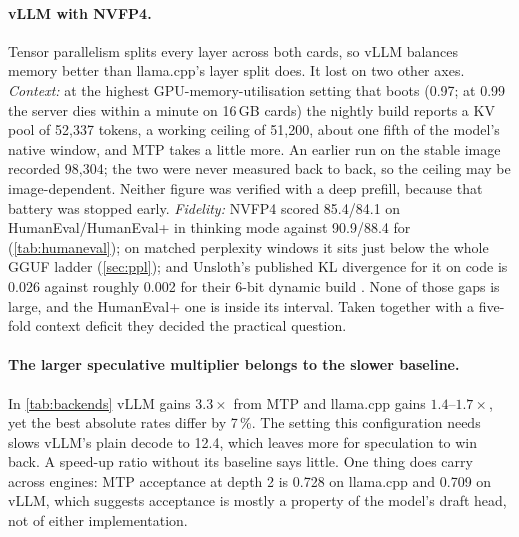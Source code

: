 \paragraph{vLLM with NVFP4.} Tensor parallelism splits every layer across both cards, so vLLM balances
memory better than llama.cpp's layer split does. It lost on two other axes. \emph{Context:} at the
highest GPU-memory-utilisation setting that boots (0.97; at 0.99 the server dies within a minute on
16\,GB cards) the nightly build reports a KV pool of 52{,}337 tokens, a working ceiling of 51{,}200,
about one fifth of the model's native window, and MTP takes a little more. An earlier run on the
stable image recorded 98{,}304; the two were never measured back to back, so the ceiling may be
image-dependent. Neither figure was verified with a deep prefill, because that battery was stopped
early. \emph{Fidelity:} NVFP4 scored 85.4/84.1 on HumanEval/HumanEval+ in thinking mode against
90.9/88.4 for \QsixXL{} (\cref{tab:humaneval}); on matched perplexity windows it sits just below the
whole GGUF ladder (\cref{sec:ppl}); and Unsloth's published KL divergence for it on code is 0.026
against roughly 0.002 for their 6-bit dynamic build \citep{unsloth_dynamic3}. None of those gaps is
large, and the HumanEval+ one is inside its interval. Taken together with a five-fold context deficit
they decided the practical question.

\paragraph{The larger speculative multiplier belongs to the slower baseline.} In \cref{tab:backends}
vLLM gains $3.3\times$ from MTP and llama.cpp gains $1.4$--$1.7\times$, yet the best absolute rates
differ by 7\,\%. The  setting this configuration needs slows vLLM's plain decode to
12.4\tps, which leaves more for speculation to win back. A speed-up ratio without its baseline says
little. One thing does carry across engines: MTP acceptance at depth 2 is 0.728 on llama.cpp and 0.709
on vLLM, which suggests acceptance is mostly a property of the model's draft head, not of either
implementation.

